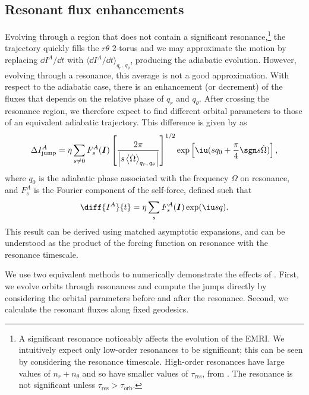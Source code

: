 \subsection{Resonant flux enhancements}
Evolving through a region that does not contain a significant resonance,\footnote{A significant resonance noticeably affects the evolution of the EMRI. We intuitively expect only low-order resonances to be significant; this can be seen by considering the resonance timescale. High-order resonances have large values of $n_r + n_\theta$ and so have smaller values of $\tau_\mathrm{res}$, from . The resonance is not significant unless $\tau_\mathrm{res} > \tau_\mathrm{orb}$.} the trajectory quickly fills the $r\theta$ 2-torus and we may approximate the motion by replacing $\dd I^A/\dd t$ with $\langle\dd I^A/\dd t\rangle_{q_r,\,q_\theta}$, producing the adiabatic evolution. However, evolving through a resonance, this average is not a good approximation. With respect to the adiabatic case, there is an enhancement (or decrement) of the fluxes that depends on the relative phase of $q_r$ and $q_\theta$. After crossing the resonance region, we therefore expect to find different orbital parameters to those of an equivalent adiabatic trajectory. This difference is given by \citet{flanagan_transient_2012} as
\begin{equation}
\label{eq:res-jump}
\Delta I^A_\mathrm{jump} = \eta\sum_{s \neq 0} F^A_s(\boldsymbol{I}) \left[ \frac{2\pi}{\left|s\left\langle\dot{\Omega}\right\rangle_{q_r,\,q_\theta}\right|} \right]^{1/2} \exp\left[\iu (s q_0 + \frac{\pi}{4}\sgn s\dot{\Omega})\right],
\end{equation}
where $q_0$ is the adiabatic phase associated with the frequency $\Omega$ on resonance, and $F^A_s$ is the Fourier component of the self-force, defined such that
\begin{equation}
\diff{I^A}{t} = \eta\sum_s F^A_s(\boldsymbol{I})\exp(\iu s q).
\end{equation}
This result can be derived using matched asymptotic expansions, and can be understood as the product of the forcing function on resonance with the resonance timescale.

We use two equivalent methods to numerically demonstrate the effects of . First, we evolve orbits through resonances and compute the jumps directly by considering the orbital parameters before and after the resonance. Second, we calculate the resonant fluxes along fixed geodesics.

